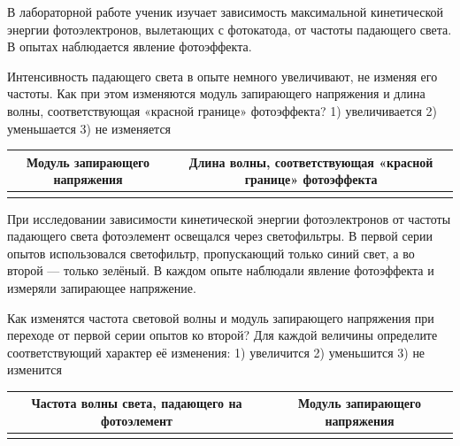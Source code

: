 \begin{taskbasic}[code={\label{task:photo_intensity_inc_u_and_redline}}]
В лабораторной работе ученик изучает зависимость максимальной кинетической энергии фотоэлектронов, вылетающих с фотокатода, от частоты падающего света. В опытах наблюдается явление фотоэффекта.

Интенсивность падающего света в опыте немного увеличивают, не изменяя его частоты. Как при этом изменяются модуль запирающего напряжения и длина волны, соответствующая «красной границе» фотоэффекта?
1) увеличивается
2) уменьшается
3) не изменяется

\nopagebreak\smallskip
\begin{center}
\small
\begin{tabular}{|c|c|}
\hline
Модуль запирающего напряжения & Длина волны, соответствующая «красной границе» фотоэффекта \\ \hline
 & \\ \hline
\end{tabular}
\end{center}

\end{taskbasic}

\begin{taskbasic}[code={\label{task:photo_blue_to_green_freq_and_u}}]
При исследовании зависимости кинетической энергии фотоэлектронов от частоты падающего света фотоэлемент освещался через светофильтры. В первой серии опытов использовался светофильтр, пропускающий только синий свет, а во второй --- только зелёный. В каждом опыте наблюдали явление фотоэффекта и измеряли запирающее напряжение.

Как изменятся частота световой волны и модуль запирающего напряжения при переходе от первой серии опытов ко второй? Для каждой величины определите соответствующий характер её изменения:
1) увеличится
2) уменьшится
3) не изменится

\nopagebreak\smallskip
\begin{center}
\small
\begin{tabular}{|c|c|}
\hline
Частота волны света, падающего на фотоэлемент & Модуль запирающего напряжения \\ \hline
 & \\ \hline
\end{tabular}
\end{center}

\end{taskbasic}

